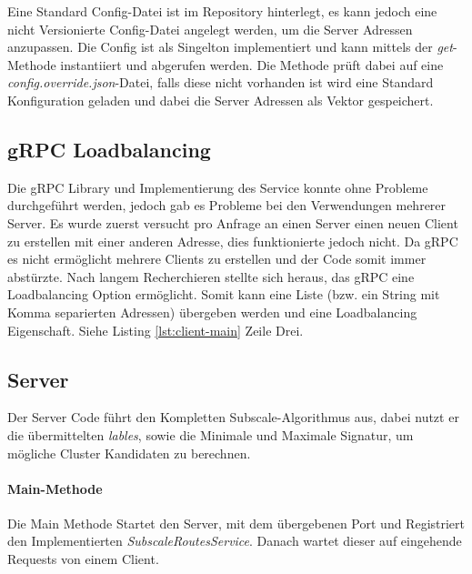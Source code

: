 Eine Standard Config-Datei ist im Repository hinterlegt, es kann jedoch eine nicht Versionierte Config-Datei angelegt werden, um die Server Adressen anzupassen.
Die Config ist als Singelton implementiert und kann mittels der \textit{get}-Methode instantiiert und abgerufen werden. Die Methode prüft dabei auf eine \textit{config.override.json}-Datei, falls diese nicht vorhanden ist wird eine Standard Konfiguration geladen und dabei die Server Adressen als Vektor gespeichert.


\subsection{gRPC Loadbalancing}
Die gRPC Library und Implementierung des Service konnte ohne Probleme durchgeführt werden, jedoch gab es Probleme bei den Verwendungen mehrerer Server. Es wurde zuerst versucht pro Anfrage an einen Server einen neuen Client zu erstellen mit einer anderen Adresse, dies funktionierte jedoch nicht. Da gRPC es nicht ermöglicht mehrere Clients zu erstellen und der Code somit immer abstürzte. Nach langem Recherchieren stellte sich heraus, das gRPC eine Loadbalancing Option ermöglicht. Somit kann eine Liste (bzw. ein String mit Komma separierten Adressen) übergeben werden und eine Loadbalancing Eigenschaft. Siehe Listing \ref{lst:client-main} Zeile Drei.

\subsection{Server}
\label{sec:server}
Der Server Code führt den Kompletten Subscale-Algorithmus aus, dabei nutzt er die übermittelten \textit{lables}, sowie die Minimale und Maximale Signatur, um mögliche Cluster Kandidaten zu berechnen. 

\paragraph{Main-Methode} Die Main Methode Startet den Server, mit dem übergebenen Port und Registriert den Implementierten \textit{SubscaleRoutesService}. Danach wartet dieser auf eingehende Requests von einem Client.


